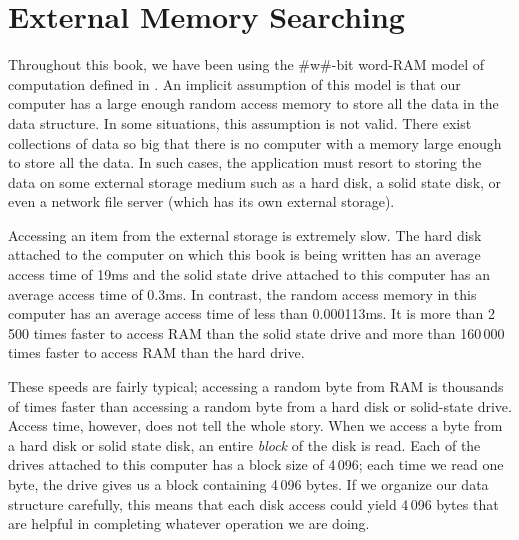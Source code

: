 \chapter{External Memory Searching}

Throughout this book, we have been using the #w#-bit word-RAM model
of computation defined in .   An implicit assumption of
this model is that our computer has a large enough random access memory
to store all the data in the data structure.  In some situations, this
assumption is not valid.  There exist collections of data so big that
there is no computer with a memory large enough to store all the data.
In such cases, the application must resort to storing the data on some
external storage medium such as a hard disk, a solid state disk, or even
a network file server (which has its own external storage).

Accessing an item from the external storage is extremely slow.  The hard
disk attached to the computer on which this book is being written has
an average access time of 19ms and the solid state drive attached to
this computer has an average access time of 0.3ms.  In contrast, the
random access memory in this computer has an average access time of less
than 0.000113ms.  It is more than 2\,500 times faster to access RAM than
the solid state drive and more than 160\,000 times faster to access RAM
than the hard drive.

% 
% 

These speeds are fairly typical;  accessing a random byte from RAM is
thousands of times faster than accessing a random byte from a hard disk
or solid-state drive.  Access time, however, does not tell the whole
story.  When we access a byte from a hard disk or solid state disk, an
entire \emph{block} of the disk is read.  Each of the drives attached
to this computer has a block size of 4\,096; each time we read one byte,
the drive gives us a block containing 4\,096 bytes.  If we organize our
data structure carefully, this means that each disk access could yield
4\,096 bytes that are helpful in completing whatever operation we are doing.

